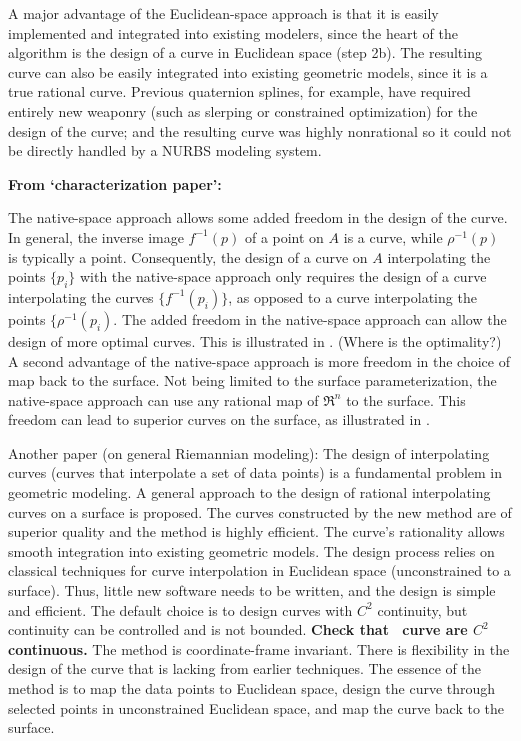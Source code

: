 A major advantage of the Euclidean-space approach is that it is easily
implemented and integrated into existing modelers,
since the heart of the algorithm is the design
of a curve in Euclidean space (step 2b).
The resulting curve can also be easily integrated into existing
geometric models, since it is a true rational curve.
Previous quaternion splines, for example, have required entirely new
weaponry (such as slerping or constrained optimization)
for the design of the curve;
and the resulting curve was highly nonrational so it could not be
directly handled by a NURBS modeling system.

%
%
{\bf From `characterization paper':}

The native-space approach allows some added freedom in the design of the curve.
In general, the inverse image $f^{-1}(p)$ of a point on $A$ is a curve,
while $\rho^{-1}(p)$ is typically a point.
Consequently, the design of a curve on $A$ interpolating the points $\{p_i\}$
with the native-space approach
only requires the design of a curve interpolating the curves
$\{f^{-1}(p_i)\}$, as opposed to a curve interpolating
the points $\{\rho^{-1}(p_i)$.
The added freedom in the native-space approach can allow the design
of more optimal curves.
This is illustrated in \cite{dietz93}. (Where is the optimality?)
A second advantage of the native-space approach is more freedom
in the choice of map back to the surface.
Not being limited to the surface parameterization,
the native-space approach can use any rational map of $\Re^n$ to the surface.
This freedom can lead to superior curves on the surface, as illustrated
in \cite{jj+jimbo99}.


Another paper (on general Riemannian modeling):
The design of interpolating curves 
(curves that interpolate a set of data points) 
is a fundamental problem in geometric modeling.
A general approach to the design of rational interpolating curves on a surface
is proposed.
The curves constructed by the new method are of superior quality
and the method is highly efficient.
The curve's rationality allows smooth integration into existing
geometric models.
The design process relies on classical techniques for curve
interpolation in Euclidean space (unconstrained to a surface).
Thus, little new software needs to be written, and the design is simple
and efficient.
The default choice is to design curves with $C^2$ continuity,
but continuity can be controlled and is not bounded.
{\bf Check that \ curve are $C^2$ continuous.}
The method is coordinate-frame invariant.
There is flexibility in the design of the curve that is lacking from 
earlier techniques.
The essence of the method is to map the data points to Euclidean space,
design the curve through selected points in unconstrained Euclidean space, 
and map the curve back to the surface.


